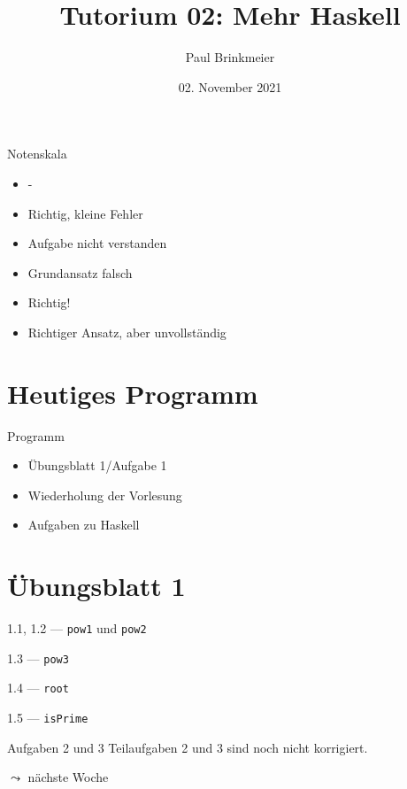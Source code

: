 \documentclass{beamer}
\title{Tutorium 02: Mehr Haskell}
\author{Paul Brinkmeier}
\institute{Tutorium Programmierparadigmen am KIT}
\date{02. November 2021}
\begin{document}
\begin{frame}
	\titlepage
\end{frame}

\begin{frame}{Notenskala}
	\begin{itemize}
		\item -
		\item Richtig, kleine Fehler
		\item Aufgabe nicht verstanden
		\item Grundansatz falsch
		\item Richtig!
		\item Richtiger Ansatz, aber unvollständig
	\end{itemize}
\end{frame}

\section{Heutiges Programm}
\begin{frame}{Programm}
	\begin{itemize}
		\item Übungsblatt 1/Aufgabe 1
		\item Wiederholung der Vorlesung
		\item Aufgaben zu Haskell
	\end{itemize}
\end{frame}

\section{Übungsblatt 1}

\begin{frame}{1.1, 1.2 --- \texttt{pow1} und \texttt{pow2}}
\end{frame}

\begin{frame}{1.3 --- \texttt{pow3}}
\end{frame}

\begin{frame}{1.4 --- \texttt{root}}
\end{frame}

\begin{frame}{1.5 --- \texttt{isPrime}}
\end{frame}

\begin{frame}{Aufgaben 2 und 3}
  Teilaufgaben 2 und 3 sind noch nicht korrigiert.

  $\leadsto$ nächste Woche
\end{frame}
\end{document}
